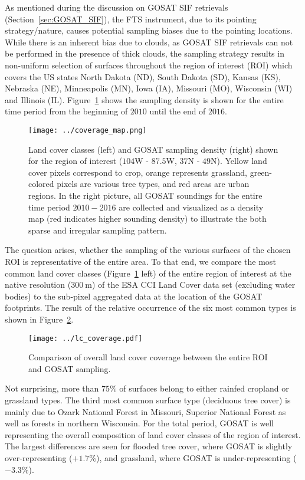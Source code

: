 \documentclass[preprint, a4paper, 10pt, times]{elsarticle}
\begin{document}
As mentioned during the discussion on GOSAT SIF retrievals (Section~\ref{sec:GOSAT_SIF}), the FTS instrument, due to its pointing strategy/nature, causes potential sampling biases due to the pointing locations. While there is an inherent bias due to clouds, as GOSAT SIF retrievals can not be performed in the presence of thick clouds, the sampling strategy results in non-uniform selection of surfaces throughout the region of interest (ROI) which covers the US states North Dakota (ND), South Dakota (SD), Kansas (KS), Nebraska (NE), Minneapolis (MN), Iowa (IA), Missouri (MO), Wisconsin (WI) and Illinois (IL). Figure~\ref{fig:sampling} shows the sampling density is shown for the entire time period from the beginning of $2010$ until the end of $2016$. 

\begin{figure}[htbp]
\centering
\texttt{[image: ../coverage\_map.png]}
\caption{Land cover classes (left) and GOSAT sampling density (right) shown for the region of interest ($104$W - $87.5$W, $37$N - $49$N). Yellow land cover pixels correspond to crop, orange represents grassland, green-colored pixels are various tree types, and red areas are urban regions. In the right picture, all GOSAT soundings for the entire time period $2010-2016$ are collected and visualized as a density map (red indicates higher sounding density) to illustrate the both sparse and irregular sampling pattern.}
\label{fig:sampling}
\end{figure}

The question arises, whether the sampling of the various surfaces of the chosen ROI is representative of the entire area. To that end, we compare the most common land cover classes (Figure~\ref{fig:sampling} left) of the entire region of interest at the native resolution ($300\:\mathrm{m}$) of the ESA CCI Land Cover data set (excluding water bodies) to the sub-pixel aggregated data at the location of the GOSAT footprints. The result of the relative occurrence of the six most common types is shown in Figure~\ref{fig:lc_coverage}. 

\begin{figure}[htbp]
\centering
\texttt{[image: ../lc\_coverage.pdf]}
\caption{Comparison of overall land cover coverage between the entire ROI and GOSAT sampling.}
\label{fig:lc_coverage}
\end{figure}

Not surprising, more than $75\%$ of surfaces belong to either rainfed cropland or grassland types. The third most common surface type (deciduous tree cover) is mainly due to Ozark National Forest in Missouri, Superior National Forest as well as forests in northern Wisconsin. For the total period, GOSAT is well representing the overall composition of land cover classes of the region of interest. The largest differences are seen for flooded tree cover, where GOSAT is slightly over-representing ($+1.7\%$), and grassland, where GOSAT is under-representing ($-3.3\%$).
\end{document}
